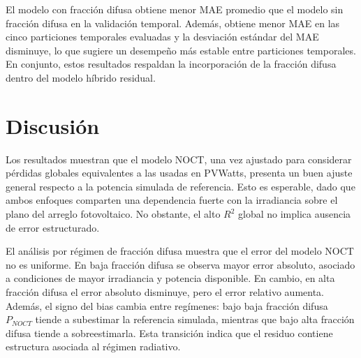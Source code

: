 \documentclass[12pt, letterpaper]{article}
\begin{document}
\begin{table}[H]
\centering
\caption{Resumen de validaci\'on temporal con cinco particiones, reportando promedio \(\pm\) desviaci\'on est\'andar muestral.}
\label{tab:validacion_temporal}
\end{table}

El modelo con fracci\'on difusa obtiene menor MAE promedio que el modelo sin fracci\'on difusa en la validaci\'on temporal. Adem\'as, obtiene menor MAE en las cinco particiones temporales evaluadas y la desviaci\'on est\'andar del MAE disminuye, lo que sugiere un desempe\~no m\'as estable entre particiones temporales. En conjunto, estos resultados respaldan la incorporaci\'on de la fracci\'on difusa dentro del modelo h\'ibrido residual.


\section{Discusi\'on}

Los resultados muestran que el modelo NOCT, una vez ajustado para considerar p\'erdidas globales equivalentes a las usadas en PVWatts, presenta un buen ajuste general respecto a la potencia simulada de referencia. Esto es esperable, dado que ambos enfoques comparten una dependencia fuerte con la irradiancia sobre el plano del arreglo fotovoltaico. No obstante, el alto \(R^2\) global no implica ausencia de error estructurado.

El an\'alisis por r\'egimen de fracci\'on difusa muestra que el error del modelo NOCT no es uniforme. En baja fracci\'on difusa se observa mayor error absoluto, asociado a condiciones de mayor irradiancia y potencia disponible. En cambio, en alta fracci\'on difusa el error absoluto disminuye, pero el error relativo aumenta. Adem\'as, el signo del bias cambia entre reg\'imenes: bajo baja fracci\'on difusa \(P_{NOCT}\) tiende a subestimar la referencia simulada, mientras que bajo alta fracci\'on difusa tiende a sobreestimarla. Esta transici\'on indica que el residuo contiene estructura asociada al r\'egimen radiativo.
\end{document}
